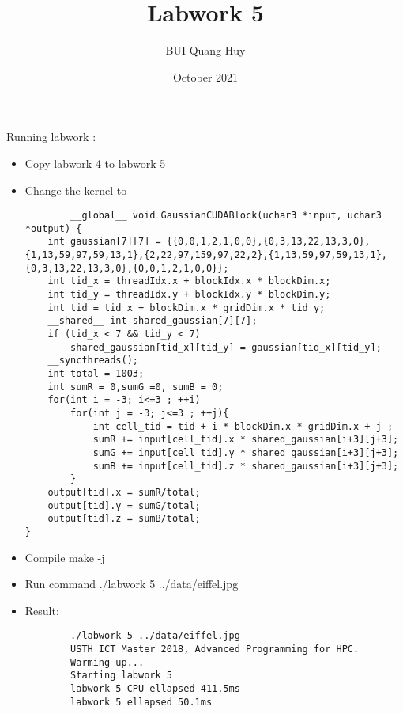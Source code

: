 \documentclass{article}
\title{Labwork 5}
\author{BUI Quang Huy}
\date{October 2021}
\begin{document}
\maketitle

Running labwork :
\begin{itemize}
    \item Copy labwork 4 to labwork 5
    \item Change the kernel to 
    \begin{lstlisting}
        __global__ void GaussianCUDABlock(uchar3 *input, uchar3 *output) {
    int gaussian[7][7] = {{0,0,1,2,1,0,0},{0,3,13,22,13,3,0},{1,13,59,97,59,13,1},{2,22,97,159,97,22,2},{1,13,59,97,59,13,1},{0,3,13,22,13,3,0},{0,0,1,2,1,0,0}};
    int tid_x = threadIdx.x + blockIdx.x * blockDim.x;
    int tid_y = threadIdx.y + blockIdx.y * blockDim.y;
    int tid = tid_x + blockDim.x * gridDim.x * tid_y;
    __shared__ int shared_gaussian[7][7];
    if (tid_x < 7 && tid_y < 7)
        shared_gaussian[tid_x][tid_y] = gaussian[tid_x][tid_y];
    __syncthreads();
    int total = 1003;
    int sumR = 0,sumG =0, sumB = 0;
    for(int i = -3; i<=3 ; ++i)
        for(int j = -3; j<=3 ; ++j){
            int cell_tid = tid + i * blockDim.x * gridDim.x + j ;
            sumR += input[cell_tid].x * shared_gaussian[i+3][j+3];
            sumG += input[cell_tid].y * shared_gaussian[i+3][j+3];
            sumB += input[cell_tid].z * shared_gaussian[i+3][j+3];
        }
    output[tid].x = sumR/total;
    output[tid].y = sumG/total;
    output[tid].z = sumB/total;
}
    \end{lstlisting}
    \item Compile make -j
    \item Run command ./labwork 5 ../data/eiffel.jpg
    \item Result:\begin{lstlisting}
        ./labwork 5 ../data/eiffel.jpg
        USTH ICT Master 2018, Advanced Programming for HPC.
        Warming up...
        Starting labwork 5
        labwork 5 CPU ellapsed 411.5ms
        labwork 5 ellapsed 50.1ms
    \end{lstlisting}
\end{itemize}
\end{document}
